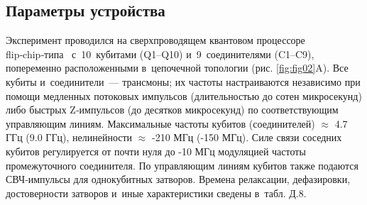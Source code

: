 
\subsection*{Параметры устройства}

Эксперимент проводился на сверхпроводящем квантовом процессоре
flip‑chip‑типа \cite{cite_44} с 10 кубитами (Q1–Q10) и 9 соединителями (C1–C9),
попеременно расположенными в цепочечной топологии (рис. \ref{fig:fig02}A). Все
кубиты и соединители — трансмоны; их частоты настраиваются независимо при
помощи медленных потоковых импульсов (длительностью до сотен микросекунд) либо
быстрых Z‑импульсов (до десятков микросекунд) по соответствующим управляющим
линиям. Максимальные частоты кубитов (соединителей) $\approx$ 4.7 ГГц (9.0
ГГц), нелинейности $\approx$ -210 МГц (-150 МГц). Силе связи соседних кубитов
регулируется от почти нуля до -10 МГц модуляцией частоты промежуточного
соединителя. По управляющим линиям кубитов также подаются СВЧ‑импульсы для
однокубитных затворов. Времена релаксации, дефазировки, достоверности затворов
и иные характеристики сведены в табл. Д.8.

